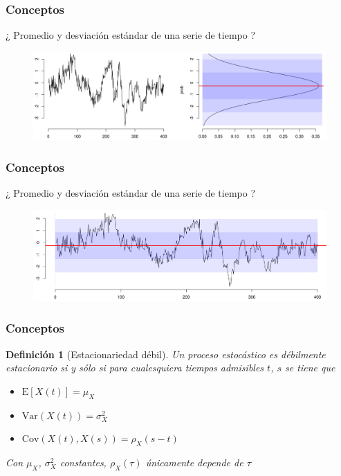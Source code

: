 \documentclass[11pt]{beamer}
\newtheorem{defn}{Definici\'on}
\newcommand{\E}[1]{\mathrm{E}\left[ #1 \right]}
\newcommand{\Var}[1]{\mathrm{Var}\left( #1 \right)}
\newcommand{\Cov}[1]{\mathrm{Cov}\left( #1 \right)}
\begin{document}

\begin{frame}\frametitle{Conceptos}
¿ Promedio y desviaci\'on est\'andar de una serie de tiempo ?
\begin{figure}
\centering
\includegraphics[width=\linewidth]{./curso_scripts/mu_x.png}
\end{figure}
\end{frame}


\begin{frame}\frametitle{Conceptos}
¿ Promedio y desviaci\'on est\'andar de una serie de tiempo ?
\begin{figure}
\centering
\includegraphics[width=\linewidth]{./curso_scripts/serie_mu.png}
\end{figure}
\end{frame}


\begin{frame}\frametitle{Conceptos}
\begin{defn}[Estacionariedad d\'ebil]
Un proceso estoc\'astico es d\'ebilmente estacionario si y s\'olo si para cualesquiera tiempos 
admisibles $t$, $s$ se tiene que
\begin{itemize}
\item $\E{X(t)} = \mu_X$
\item $\Var{X(t)} = \sigma^{2}_X$
\item $\Cov{X(t),X(s)} = \rho_X (s-t)$
\end{itemize}
Con $\mu_X$, $\sigma^{2}_X$ constantes, $\rho_X(\tau)$ \'unicamente depende de $\tau$
\end{defn}
\end{frame}
\end{document}

